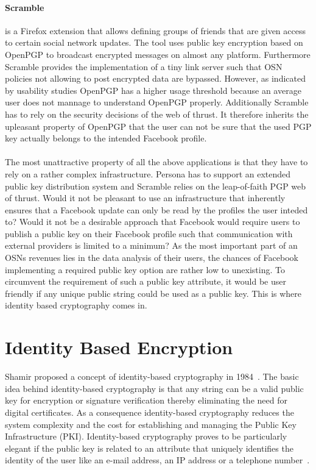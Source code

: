 \documentclass[journal]{IEEEtran}
\begin{document}
\paragraph{Scramble} is a Firefox extension that allows defining groups of
friends that are given access to certain social network updates. The tool uses
public key encryption based on OpenPGP \cite{rfc4880} to broadcast encrypted
messages on almost any platform. Furthermore Scramble provides the
implementation of a tiny link server such that OSN policies not allowing to post
encrypted data are bypassed. However, as indicated by usability studies
\cite{WhittenJohnny} OpenPGP has a higher usage threshold because an average
user does not mannage to understand OpenPGP properly. Additionally Scramble has
to rely on the security decisions of the web of thrust. It therefore inherits
the upleasant property of OpenPGP that the user can not be sure that the used
PGP key actually belongs to the intended Facebook profile.\cite{BeatoScramble}\\
\\
The most unattractive property of all the above applications is that they have
to rely on a rather complex infrastructure. Persona has to support an extended
public key distribution system and Scramble relies on the leap-of-faith PGP web
of thrust. Would it not be pleasant to use an infrastructure that inherently
ensures that a Facebook update can only be read by the profiles the user
inteded to? Would it not be a desirable approach that Facebook would require
users to publish a public key on their Facebook profile such that communication
with external providers is limited to a minimum? As the most important part of
an OSNs revenues lies in the data analysis of their users, the chances of
Facebook implementing a required public key option are rather low to
unexisting. To circumvent the requirement of such a public key attribute, it
would be user friendly if any unique public string could be used as a public
key. This is where identity based cryptography comes in.


\section{Identity Based Encryption}\label{sec:ibe}
Shamir proposed a concept of identity-based cryptography in
1984~\cite{DBLP:conf/crypto/Shamir84}. The basic idea behind identity-based
cryptography is that any string can be a valid public key for encryption or
signature verification thereby eliminating the need for digital certificates.
As a consequence identity-based cryptography reduces the system
complexity and the cost for establishing and managing the Public
Key Infrastructure (PKI). Identity-based cryptography proves to be particularly
elegant if the public key is related to an attribute that uniquely identifies
the identity of the user like an e-mail address, an IP address or a telephone
number~\cite{Baek04asurvey}.
\end{document}
